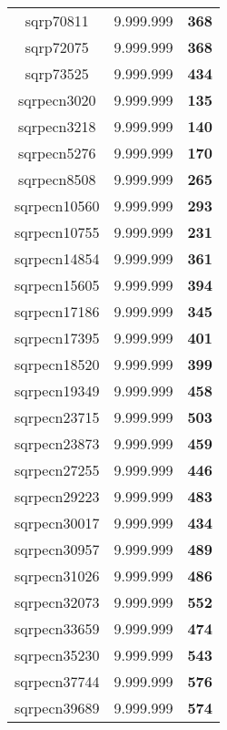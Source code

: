 \begin{tabular}{cc||c}
sqrp70811        & 9.999.999        & {\bf 368}       \\ 
sqrp72075        & 9.999.999        & {\bf 368}       \\ 
sqrp73525        & 9.999.999        & {\bf 434}       \\ 
sqrpecn3020      & 9.999.999        & {\bf 135}       \\ 
sqrpecn3218      & 9.999.999        & {\bf 140}       \\ 
sqrpecn5276      & 9.999.999        & {\bf 170}       \\ 
sqrpecn8508      & 9.999.999        & {\bf 265}       \\ 
sqrpecn10560     & 9.999.999        & {\bf 293}       \\ 
sqrpecn10755     & 9.999.999        & {\bf 231}       \\ 
sqrpecn14854     & 9.999.999        & {\bf 361}       \\ 
sqrpecn15605     & 9.999.999        & {\bf 394}       \\ 
sqrpecn17186     & 9.999.999        & {\bf 345}       \\ 
sqrpecn17395     & 9.999.999        & {\bf 401}       \\ 
sqrpecn18520     & 9.999.999        & {\bf 399}       \\ 
sqrpecn19349     & 9.999.999        & {\bf 458}       \\ 
sqrpecn23715     & 9.999.999        & {\bf 503}       \\ 
sqrpecn23873     & 9.999.999        & {\bf 459}       \\ 
sqrpecn27255     & 9.999.999        & {\bf 446}       \\ 
sqrpecn29223     & 9.999.999        & {\bf 483}       \\ 
sqrpecn30017     & 9.999.999        & {\bf 434}       \\ 
sqrpecn30957     & 9.999.999        & {\bf 489}       \\ 
sqrpecn31026     & 9.999.999        & {\bf 486}       \\ 
sqrpecn32073     & 9.999.999        & {\bf 552}       \\ 
sqrpecn33659     & 9.999.999        & {\bf 474}       \\ 
sqrpecn35230     & 9.999.999        & {\bf 543}       \\ 
sqrpecn37744     & 9.999.999        & {\bf 576}       \\ 
sqrpecn39689     & 9.999.999        & {\bf 574}       \\ 

\end{tabular}

